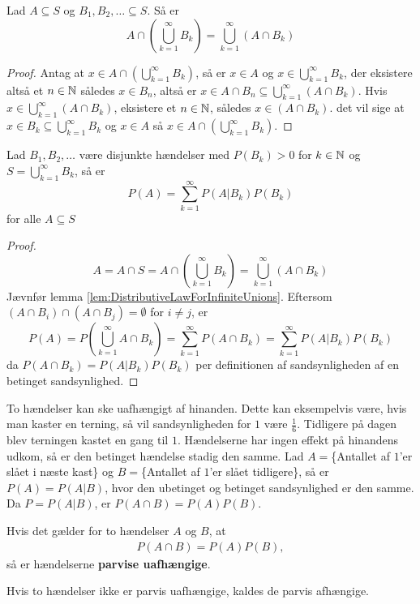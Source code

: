 \begin{lem} \label{lem:DistributiveLawForInfiniteUnions}
Lad $A \subseteq S$ og $B_1, B_2, \ldots \subseteq S$. Så er 
\begin{equation*}
    A \cap \left( \bigcup^\infty_{k = 1} B_k \right) = \bigcup^\infty_{k = 1} (A \cap B_k)
\end{equation*}
\end{lem}
\begin{proof}
Antag at $x \in A \cap \left( \bigcup^\infty_{k = 1} B_k\right)$, så er $x \in A$ og $x \in \bigcup^\infty_{k = 1} B_k$, der eksistere altså et $n \in \mathbb{N}$ således $x \in B_n$, altså er $x \in A \cap B_n \subseteq \bigcup^\infty_{k = 1} (A \cap B_k)$. 
Hvis $x \in \bigcup^\infty_{k = 1} (A \cap B_k)$, eksistere et $n \in \mathbb{N}$, således $x \in (A \cap B_k)$. det vil sige at $x \in B_k \subseteq \bigcup^\infty_{k = 1} B_k$ og $x \in A$ så $x \in A \cap \left( \bigcup^\infty_{k = 1} B_k \right)$.
\end{proof}


\begin{thm} \label{thm:LPT}
Lad $B_1, B_2, \ldots$ være disjunkte hændelser med $P(B_k) > 0$ for $k \in \mathbb{N}$ og $S = \bigcup^\infty_{k = 1} B_k$, så er
\begin{equation*}
    P(A) = \sum^\infty_{k = 1} P(A | B_k)P(B_k)
\end{equation*}
for alle $A \subseteq S$
\end{thm}
\begin{proof}
\begin{equation*}
    A = A \cap S = A \cap \left( \bigcup^\infty_{k = 1} B_k \right) = \bigcup^\infty_{k = 1} (A \cap B_k)
\end{equation*}
Jævnfør lemma \ref{lem:DistributiveLawForInfiniteUnions}. Eftersom $(A \cap B_i) \cap (A \cap B_j) = \emptyset$ for $i \neq j$, er 
\begin{equation*}
    P(A) = P\left( \bigcup^\infty_{k = 1} A \cap B_k\right)= \sum^\infty_{k = 1} P(A \cap B_k) = \sum^\infty_{k = 1} P(A | B_k)P(B_k)
\end{equation*}
da $P(A \cap B_k) = P(A | B_k) P(B_k)$ per definitionen af sandsynligheden af en betinget sandsynlighed.
\end{proof}

To hændelser kan ske uafhængigt af hinanden. Dette kan eksempelvis være, hvis man kaster en terning, så vil sandsynligheden for $1$ være $\frac{1}{6}$. Tidligere på dagen blev terningen kastet en gang til $1$. Hændelserne har ingen effekt på hinandens udkom, så er den betinget hændelse stadig den samme. Lad $A=$\{Antallet af $1$'er slået i næste kast\} og $B=$\{Antallet af $1$'er slået tidligere\}, så er $P(A)=P(A|B)$, hvor den ubetinget og betinget sandsynlighed er den samme.  Da $P=P(A|B)$, er  $P(A\cap B)=P(A)P(B)$. 
\begin{defn} \label{Def:def1.5} %
Hvis det gælder for to hændelser $A$ og $B$, at 
\begin{align*}
    P(A\cap B)=P(A)P(B),
\end{align*}
så er hændelserne \textbf{parvise uafhængige}. 
\end{defn}
Hvis to hændelser ikke er parvis uafhængige, kaldes de parvis afhængige.

